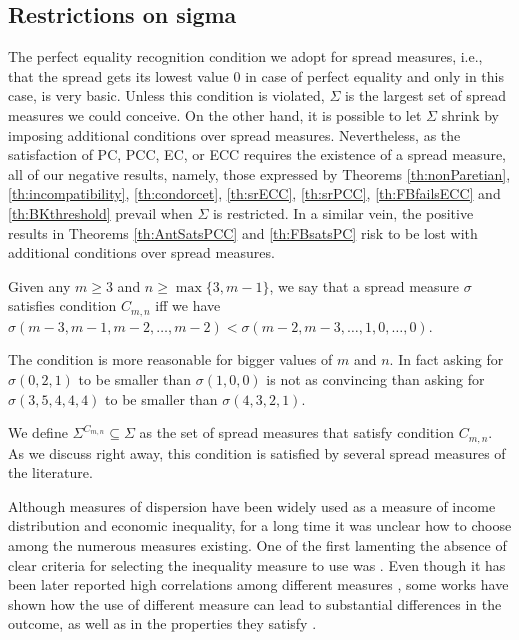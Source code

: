 \documentclass[version=3.21, pagesize, twoside=off, bibliography=totoc, DIV=calc, fontsize=12pt, a4paper]{scrartcl}
\begin{document}
\subsection{Restrictions on sigma}
\label{sec:RestrictionOnSigma}
The perfect equality recognition condition we adopt for spread measures, i.e., that the spread gets its lowest value $0$ in case of perfect equality and only in this case, is very basic. Unless this condition is violated, $\Sigma$ is the largest set of spread measures we could conceive. On the other hand, it is possible to let $\Sigma$ shrink by imposing additional conditions over spread measures. Nevertheless, as the satisfaction of PC, PCC, EC, or ECC requires the existence of a spread measure, all of our negative results, namely, those expressed by Theorems \ref{th:nonParetian}, \ref{th:incompatibility}, \ref{th:condorcet}, \ref{th:srECC}, \ref{th:srPCC}, \ref{th:FBfailsECC} and \ref{th:BKthreshold} prevail when $\Sigma$ is restricted. In a similar vein, the positive results in Theorems \ref{th:AntSatsPCC} and \ref{th:FBsatsPC} risk to be lost with additional conditions over spread measures.

\begin{definition}
	\label{def:conditionC}
	Given any $m\geq3$ and $n\geq \max\{3,m-1\}$, we say that a spread measure $\sigma$ satisfies condition $C_{m,n}$ iff we have $\sigma(m-3, m-1, m-2, \dots, m-2) < \sigma(m-2, m-3, \dots, 1, 0, \dots, 0)$.
\end{definition}


The condition is more reasonable for bigger values of $m$ and $n$. In fact asking for $\sigma(0,2,1)$ to be smaller than $\sigma(1,0,0)$ is not as convincing than asking for $\sigma(3,5,4,4,4)$ to be smaller than $\sigma(4,3,2,1)$.

We define $\Sigma^{C_{m,n}} \subseteq \Sigma$ as the set of spread measures that satisfy condition $C_{m,n}$. As we discuss right away, this condition is satisfied by several spread measures of the literature. 

Although measures of dispersion have been widely used as a measure of income distribution and economic inequality, for a long time it was unclear how to choose among the numerous measures existing. One of the first lamenting the absence of clear criteria for selecting the inequality measure to use was \citet{Dalton1920}. Even though it has been later reported high correlations among different measures \citep{Alker1964}, some works have shown how the use of different measure can lead to substantial differences in the outcome, as well as in the properties they satisfy \citep{Atkinson1970, Allison1978, Yntema1933, Sen1973, Rothschild1973}.
\end{document}
